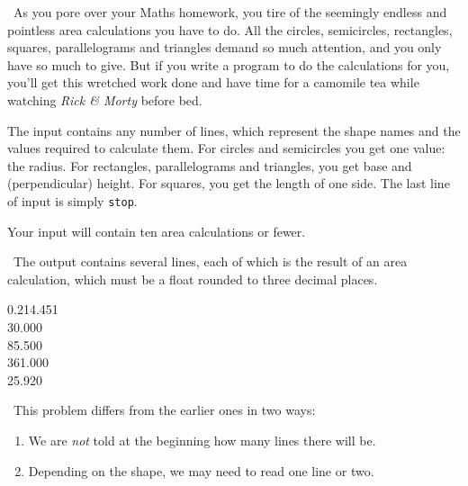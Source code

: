 
\Question\ As you pore over your Maths homework, you tire of the seemingly endless and
pointless area calculations you have to do. All the circles, semicircles, rectangles,
squares, parallelograms and triangles demand so much attention, and you only have so much
to give. But if you write a program to do the calculations for you, you'll get this
wretched work done and have time for a camomile tea while watching \emph{Rick \& Morty}
before bed.

\Input

The input contains any number of lines, which represent the shape names and the values
required to calculate them. For circles and semicircles you get one value: the radius. For
rectangles, parallelograms and triangles, you get base and (perpendicular) height. For
squares, you get the length of one side. The last line of input is simply \texttt{stop}.

Your input will contain ten area calculations or fewer.

\Output\ The output contains several lines, each of which is the result of an area
calculation, which must be a float rounded to three decimal places.

\Sample

       {0.2}{14.451\\30.000\\85.500\\361.000\\25.920}

\Scratch\ This problem differs from the earlier ones in two ways:
\begin{enumerate}
  \item We are \emph{not} told at the beginning how many lines there will be.
  \item Depending on the shape, we may need to read one line or two.
\end{enumerate}

